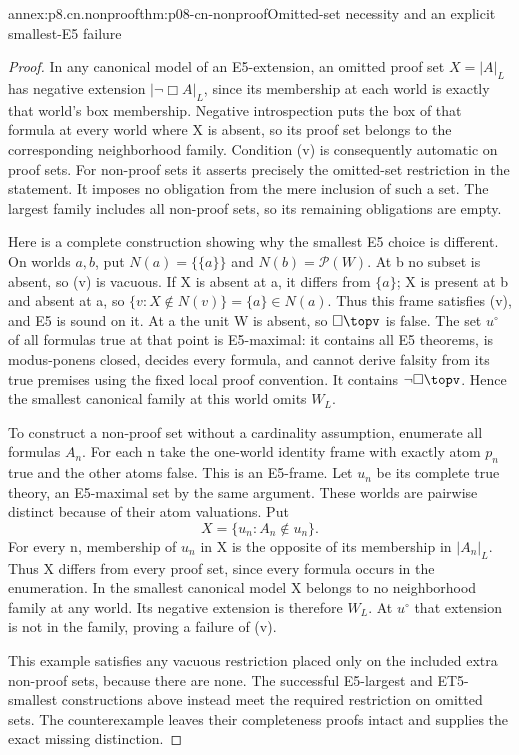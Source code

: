 \begin{annexitem}{annex:p8.cn.nonproof}{thm:p08-cn-nonproof}{Omitted-set necessity and an explicit smallest-E5 failure}
\begin{proof}
In any canonical model of an E5-extension, an omitted proof
set \(X=|A|_L\) has negative extension
\(|\neg\Box A|_L\), since its membership at each world
is exactly that world's box membership. Negative introspection
puts the box of that formula at every world where X is absent,
so its proof set belongs to the corresponding neighborhood
family. Condition (v) is consequently automatic on proof sets.
For non-proof sets it asserts precisely the omitted-set
restriction in the statement. It imposes no obligation from
the mere inclusion of such a set. The largest family includes
all non-proof sets, so its remaining obligations are empty.

Here is a complete construction showing why the smallest
E5 choice is different. On worlds \(a,b\), put
\(N(a)=\{\{a\}\}\) and \(N(b)=\mathcal P(W)\).
At b no subset is absent, so (v) is vacuous. If X is absent
at a, it differs from \(\{a\}\); X is present at b and
absent at a, so \(\{v:X\notin N(v)\}=\{a\}\in N(a)\).
Thus this frame satisfies (v), and E5 is sound on it.
At a the unit W is absent, so \(\Box\topv\) is false.
The set \(u^\circ\) of all formulas true at that point is
E5-maximal: it contains all E5 theorems, is modus-ponens closed,
decides every formula, and cannot derive falsity from its true
premises using the fixed local proof convention. It contains
\(\neg\Box\topv\). Hence the smallest canonical family
at this world omits \(W_L\).

To construct a non-proof set without a cardinality assumption,
enumerate all formulas \(A_n\). For each n take the one-world
identity frame with exactly atom \(p_n\) true and the other
atoms false. This is an E5-frame. Let \(u_n\) be its complete
true theory, an E5-maximal set by the same argument. These worlds
are pairwise distinct because of their atom valuations. Put
\[
                       X=\{u_n:A_n\notin u_n\}.
\]
For every n, membership of \(u_n\) in X is the opposite of
its membership in \(|A_n|_L\). Thus X differs from every
proof set, since every formula occurs in the enumeration.
In the smallest canonical model X belongs to no neighborhood
family at any world. Its negative extension is therefore
\(W_L\). At \(u^\circ\) that extension is not in the
family, proving a failure of (v).

This example satisfies any vacuous restriction placed only on
the included extra non-proof sets, because there are none.
The successful E5-largest and ET5-smallest constructions above
instead meet the required restriction on omitted sets. The
counterexample leaves their completeness proofs intact and
supplies the exact missing distinction.
\end{proof}
\end{annexitem}
